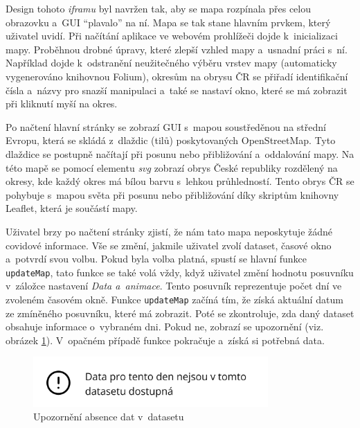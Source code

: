 Design tohoto \emph{iframu} byl navržen tak, aby se mapa rozpínala přes celou obrazovku a~GUI \enquote{plavalo} na ní. Mapa se tak stane hlavním prvkem, který uživatel uvidí. Při načítání aplikace ve webovém prohlížeči dojde k~inicializaci mapy. Proběhnou drobné úpravy, které zlepší vzhled mapy a~usnadní práci s~ní. Například dojde k~odstranění neužitečného výběru vrstev mapy (automaticky vygenerováno knihovnou Folium), okresům na obrysu ČR se přiřadí identifikační čísla a~názvy pro snazší manipulaci a~také se nastaví okno, které se má zobrazit při kliknutí myší na okres.  

Po načtení hlavní stránky se zobrazí GUI s~mapou soustředěnou na střední Evropu, která se skládá z~dlaždic (tilů) poskytovaných OpenStreetMap. Tyto dlaždice se postupně načítají při posunu nebo přibližování a~oddalování mapy. Na této mapě se pomocí elementu \emph{svg} zobrazí obrys České republiky rozdělený na okresy, kde každý okres má bílou barvu s~lehkou průhledností. Tento obrys ČR se pohybuje s~mapou světa při posunu nebo přibližování díky skriptům knihovny Leaflet, která je součástí mapy.

Uživatel brzy po načtení stránky zjistí, že nám tato mapa neposkytuje žádné covidové informace. Vše se změní, jakmile uživatel zvolí dataset, časové okno a~potvrdí svou volbu. Pokud byla volba platná, spustí se hlavní funkce \lstinline{updateMap}, tato funkce se také volá vždy, když uživatel změní hodnotu posuvníku v~záložce nastavení \emph{Data a~animace}. Tento posuvník reprezentuje počet dní ve zvoleném časovém okně. Funkce \lstinline{updateMap} začíná tím, že získá aktuální datum ze zmíněného posuvníku, které má zobrazit. Poté se zkontroluje, zda daný dataset obsahuje informace o~vybraném dni. Pokud ne, zobrazí se upozornění (viz. obrázek \ref{fig:WarningMap}). V~opačném případě funkce pokračuje a~získá si potřebná data.

\begin{figure}[h]
	\centering
	\includegraphics[width=0.8\textwidth]{Pictures/warning.png}
	\caption{Upozornění absence dat v~datasetu}
	\label{fig:WarningMap}
\end{figure}


